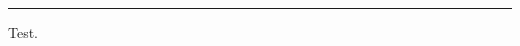 \documentclass[a4paper,11pt]{article}
\begin{document}
\begin{swarmwrap}%
  \begin{minipage}[t]{3cm}\centering\rule{\linewidth}{2cm}\end{minipage}%
\end{swarmwrap}%
\swarmwrapnext
Test.
\end{document}
